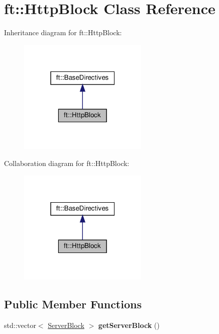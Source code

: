 \hypertarget{classft_1_1HttpBlock}{}\section{ft\+:\+:Http\+Block Class Reference}
\label{classft_1_1HttpBlock}


Inheritance diagram for ft\+:\+:Http\+Block\+:\nopagebreak
\begin{figure}[H]
\begin{center}
\leavevmode
\includegraphics[width=175pt]{classft_1_1HttpBlock__inherit__graph}
\end{center}
\end{figure}


Collaboration diagram for ft\+:\+:Http\+Block\+:\nopagebreak
\begin{figure}[H]
\begin{center}
\leavevmode
\includegraphics[width=175pt]{classft_1_1HttpBlock__coll__graph}
\end{center}
\end{figure}
\subsection*{Public Member Functions}
\begin{DoxyCompactItemize}
\item 
\mbox{\label{classft_1_1HttpBlock_a217282fb721f6f61c178673c11747ab3}} 
std\+::vector$<$ \hyperlink{classft_1_1ServerBlock}{Server\+Block} $>$ {\bfseries get\+Server\+Block} ()
\end{DoxyCompactItemize}

